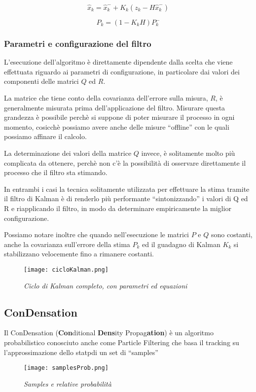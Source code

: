 \begin{equation}\label{eq:post}
\hat{x}_k=\hat{x}_k^-+K_k(z_k-H\hat{x}_k^-)
\end{equation} 

\begin{equation}\label{eq:P}
P_k=(1-K_kH)P_k^-
\end{equation} 

\subsubsection{Parametri e configurazione del filtro}
L'esecuzione dell'algoritmo è direttamente dipendente dalla scelta che viene effettuata riguardo ai parametri di configurazione, in particolare dai valori dei componenti delle matrici $Q$ ed $R$.

La matrice che tiene conto della covarianza dell'errore sulla misura, $R$, è generalmente misurata prima dell'applicazione del filtro. Misurare questa grandezza è possibile perchè si suppone di poter misurare il processo in ogni momento, cosicchè possiamo avere anche delle misure ``offline'' con le quali possiamo affinare il calcolo.

La determinazione dei valori della matrice $Q$ invece, è solitamente molto più complicata da ottenere, perchè non c'è la possibilità di osservare direttamente il processo che il filtro sta stimando. 

In entrambi i casi la tecnica solitamente utilizzata per effettuare la stima tramite il filtro di Kalman è di renderlo più performante ``sintonizzando'' i valori di Q ed R e riapplicando il filtro, in modo da determinare empiricamente la miglior configurazione. 

Possiamo notare inoltre che quando nell'esecuzione le matrici $P$ e $Q$ sono costanti, anche la covarianza sull'errore della stima $P_k$ ed il guadagno di Kalman $K_k$ si stabilizzano velocemente fino a rimanere costanti.
\begin{figure}[hb]
\centering
	\texttt{[image: cicloKalman.png]}
\caption{\textit{Ciclo di Kalman completo, con parametri ed equazioni}\label{fig:completeKalman}}
\end{figure}

\subsection{ConDensation}\label{condensation}
Il ConDensation (\textbf{Con}ditional \textbf{Dens}ity Propag\textbf{ation}) \cite{condensation} è un algoritmo probabilistico conosciuto anche come Particle Filtering che basa il tracking su l'approssimazione dello statpdi un set di ``samples''
\begin{figure}[hb]
\centering
	\texttt{[image: samplesProb.png]}
\caption{\textit{Samples e relative probabilità}\label{fig:samplesProb}}
\end{figure}

